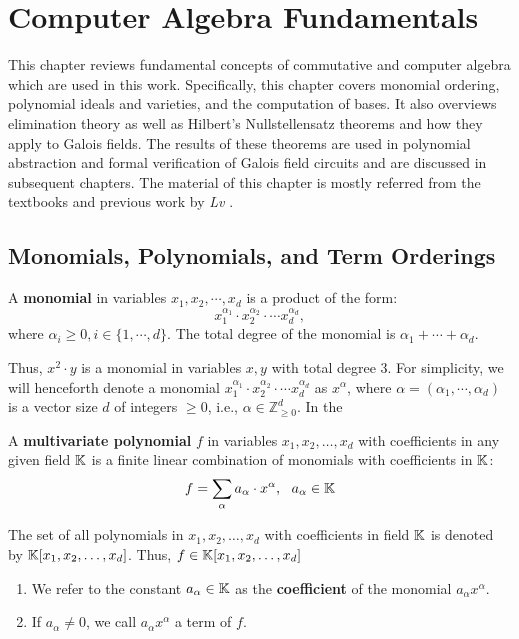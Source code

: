 \chapter{Computer Algebra Fundamentals} \label{ch:ideals}
This chapter reviews fundamental concepts of commutative and 
computer algebra which are used in this work. 
Specifically, this chapter covers monomial ordering, polynomial ideals and 
varieties, and the computation of \Grobner bases.
It also overviews elimination theory as well as Hilbert's Nullstellensatz 
theorems and how
they apply to Galois fields. The results of these theorems are used in polynomial
abstraction and formal verification of Galois field circuits and 
are discussed 
in subsequent chapters. The material of this chapter is
mostly referred from the textbooks \cite{ideals:book} \cite{gb_book} and 
previous work by {\it Lv} \cite{lv:phd}. 

\section{Monomials, Polynomials, and Term Orderings}

\begin{Definition} \label{def:mono}
A {\bf monomial} in variables $x_1,x_2,\cdots,x_d$ is a product of the form:
\begin{equation}
x_1^{{\alpha}_1} \cdot x_2^{{\alpha}_2} \cdot \cdots x_d^{{\alpha}_d},
\end{equation}
where $\alpha_i \ge 0, i\in\{1,\cdots,d\}$. 
The total degree of the monomial is $\alpha_{1}+\cdots+\alpha_{d}$.
\end{Definition} 

Thus, $x^2\cdot y$ is a monomial in variables $x,y$ with total degree $3$.
For simplicity, we will henceforth denote a 
monomial $x_1^{{\alpha}_1} \cdot x_2^
{{\alpha}_2} \cdot \cdots x_d^{{\alpha}_d}$ as $x^{\alpha}$, 
where $\alpha=({\alpha}_1,\cdots,{\alpha}_d)$ is a vector size $d$ of 
integers $\ge 0$, i.e., $\alpha \in \mathbb{Z}_{\ge 0}^{d}$. In the

\begin{Definition}
A {\bf multivariate polynomial} $f$ in variables $x_1, x_2, \ldots, x_d$ 
with coefficients in any given field ${\mathbb{K}}$ is a finite linear 
combination of monomials with coefficients in ${\mathbb{K}}$: 
\begin{equation}
	f=\sum_{\alpha}a_{\alpha}\cdot x^{\alpha}, ~~a_{\alpha}\in {\mathbb{K}} \nonumber
\end{equation}

The set of all polynomials in $x_1, x_2, \ldots, x_d$ with coefficients in 
field ${\mathbb{K}}$ is denoted by ${\mathbb{K}}[x_1, x_2, \ldots, x_d]$. 
Thus, $f \in {\mathbb{K}}[x_1, x_2, \ldots, x_d]$

\begin{enumerate}
\item We refer to the constant $a_{\alpha} \in {\mathbb{K}}$ as the 
{\bf coefficient} of the monomial $a_{\alpha} x^{\alpha}$.
\item If $a_{\alpha} \neq 0$, we call $a_{\alpha} x^{\alpha}$ a term of $f$.
\end{enumerate}
\end{Definition}

